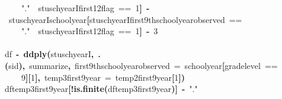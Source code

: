 \documentclass[12pt]{article}
\makeatletter
\newcommand{\hlnumber}[1]{\textcolor[rgb]{0,0,0}{#1}}%
\newcommand{\hlfunctioncall}[1]{\textcolor[rgb]{0.501960784313725,0,0.329411764705882}{\textbf{#1}}}%
\newcommand{\hlstring}[1]{\textcolor[rgb]{0.6,0.6,1}{#1}}%
\newcommand{\hlkeyword}[1]{\textcolor[rgb]{0,0,0}{\textbf{#1}}}%
\newcommand{\hlargument}[1]{\textcolor[rgb]{0.690196078431373,0.250980392156863,0.0196078431372549}{#1}}%
\newcommand{\hlassignement}[1]{\textcolor[rgb]{0,0,0}{\textbf{#1}}}%
\newcommand{\hlsymbol}[1]{\textcolor[rgb]{0,0,0}{#1}}%
\newcommand{\hlstd}[1]{\textcolor[rgb]{0,0,0}{#1}}%
\newenvironment{kframe}{%
 \def\FrameCommand##1{\hskip\@totalleftmargin \hskip-\fboxsep
 \colorbox{shadecolor}{##1}\hskip-\fboxsep
     \hskip-\linewidth \hskip-\@totalleftmargin \hskip\columnwidth}%
 \MakeFramed {\advance\hsize-\width
   \@totalleftmargin\z@ \linewidth\hsize
   \@setminipage}}%
 {\par\unskip\endMakeFramed}
\newenvironment{knitrout}{}{} %
\renewenvironment{knitrout}{\begin{footnotesize}}{\end{footnotesize}}
\makeatother
\begin{document}
\begin{knitrout}
\begin{kframe}
\begin{flushleft}
\hlstd{}{\ }{\ }{\ }{\ }\hlstring{"{}."{}}{\ }\hlkeyword{\usebox{\hlnormalsizeboxand}}{\ }\hlsymbol{stuschyearI}\hlkeyword{\usebox{\hlnormalsizeboxdollar}}\hlsymbol{first12\usebox{\hlnormalsizeboxunderscore}flag}{\ }=={\ }\hlnumber{1}\hlkeyword{]}{\ }\hlassignement{\usebox{\hlnormalsizeboxlessthan}-}{\ }\hlsymbol{stuschyearI}\hlkeyword{\usebox{\hlnormalsizeboxdollar}}\hlsymbol{school\usebox{\hlnormalsizeboxunderscore}year}\hlkeyword{[}\hlsymbol{stuschyearI}\hlkeyword{\usebox{\hlnormalsizeboxdollar}}\hlsymbol{first9thschoolyear\usebox{\hlnormalsizeboxunderscore}observed}{\ }==\hspace*{\fill}\\
\hlstd{}{\ }{\ }{\ }{\ }\hlstring{"{}."{}}{\ }\hlkeyword{\usebox{\hlnormalsizeboxand}}{\ }\hlsymbol{stuschyearI}\hlkeyword{\usebox{\hlnormalsizeboxdollar}}\hlsymbol{first12\usebox{\hlnormalsizeboxunderscore}flag}{\ }=={\ }\hlnumber{1}\hlkeyword{]}{\ }\hlkeyword{-}{\ }\hlnumber{3}\hspace*{\fill}\\
\hlstd{}\hspace*{\fill}\\
\hlstd{}\hlsymbol{df}{\ }\hlassignement{\usebox{\hlnormalsizeboxlessthan}-}{\ }\hlfunctioncall{ddply}\hlkeyword{(}\hlsymbol{stuschyearI}\hlkeyword{,}{\ }\hlfunctioncall{.}\hlkeyword{(}\hlsymbol{sid}\hlkeyword{)}\hlkeyword{,}{\ }\hlsymbol{summarize}\hlkeyword{,}{\ }\hlargument{first9thschoolyear\usebox{\hlnormalsizeboxunderscore}observed}{\ }\hlargument{=}{\ }\hlsymbol{school\usebox{\hlnormalsizeboxunderscore}year}\hlkeyword{[}\hlsymbol{grade\usebox{\hlnormalsizeboxunderscore}level}{\ }==\hspace*{\fill}\\
\hlstd{}{\ }{\ }{\ }{\ }\hlnumber{9}\hlkeyword{]}\hlkeyword{[}\hlnumber{1}\hlkeyword{]}\hlkeyword{,}{\ }\hlargument{temp3\usebox{\hlnormalsizeboxunderscore}first9year}{\ }\hlargument{=}{\ }\hlsymbol{temp2\usebox{\hlnormalsizeboxunderscore}first9year}\hlkeyword{[}\hlnumber{1}\hlkeyword{]}\hlkeyword{)}\hspace*{\fill}\\
\hlstd{}\hlsymbol{df}\hlkeyword{\usebox{\hlnormalsizeboxdollar}}\hlsymbol{temp3\usebox{\hlnormalsizeboxunderscore}first9year}\hlkeyword{[}\hlkeyword{!}\hlfunctioncall{is.finite}\hlkeyword{(}\hlsymbol{df}\hlkeyword{\usebox{\hlnormalsizeboxdollar}}\hlsymbol{temp3\usebox{\hlnormalsizeboxunderscore}first9year}\hlkeyword{)}\hlkeyword{]}{\ }\hlassignement{\usebox{\hlnormalsizeboxlessthan}-}{\ }\hlstring{"{}."{}}\hspace*{\fill}\\

\end{flushleft}
\end{kframe}
\end{knitrout}
\end{document}
